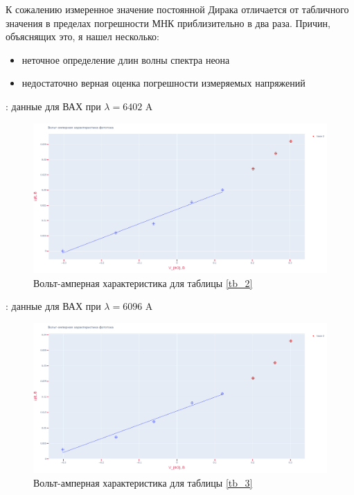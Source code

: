 \documentclass[15pt,a5paper,reqno]{article}
\begin{document}
	К сожалению измеренное значение постоянной Дирака отличается от табличного значения в пределах погрешности МНК приблизительно в два раза. Причин, объяснящих это, я нашел несколько: 
	
	\begin{itemize}
		\item неточное определение длин волны спектра неона
		\item недостаточно верная оценка погрешности измеряемых напряжений
	\end{itemize}
	
	
	\newpage

	\begin{table}[h!]
        \centering
        
        \caption{: данные для ВАХ при $\lambda = 6402$ A}
    	\label{tb_2}
	\end{table}

	\begin{figure}[h!]
		\centering
		\includegraphics[width=1.0\linewidth]{pics/vac_1.png}
		\caption{Вольт-амперная характеристика  для таблицы \ref{tb_2}}
		\label{vac1}
	\end{figure}

	\newpage

	\begin{table}[h!]
        \centering
        
        \caption{: данные для ВАХ при $\lambda = 6096$ A}
    	\label{tb_3}
	\end{table}

	\begin{figure}[h!]
		\centering
		\includegraphics[width=1.0\linewidth]{pics/vac_2.png}
		\caption{Вольт-амперная характеристика для таблицы \ref{tb_3}}
		\label{vac2}
	\end{figure}
\end{document}
